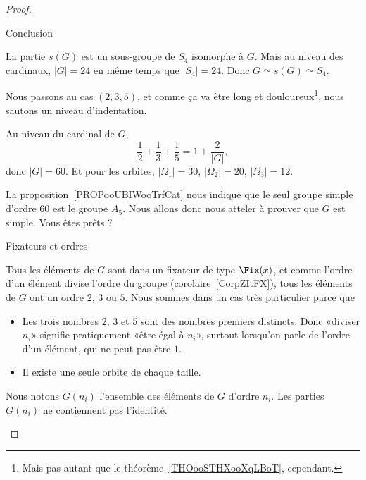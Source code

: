 \begin{proof}
\begin{subproof}
\begin{subproof}
                    \item[Conclusion]

                        La partie \( s(G)\) est un sous-groupe de \( S_4\) isomorphe à \( G\). Mais au niveau des cardinaux, \( | G |=24\) en même temps que \( | S_4 |=24\). Donc \( G\simeq s(G)\simeq S_4\).

                \end{subproof}
                \end{subproof}

        Nous passons au cas \( (2,3,5)\), et comme ça va être long et douloureux\footnote{Mais pas autant que le théorème~\ref{THOooSTHXooXqLBoT}, cependant.}, nous sautons un niveau d'indentation.

                Au niveau du cardinal de \( G\),
                \begin{equation}
                    \frac{1}{ 2 }+\frac{1}{ 3 }+\frac{1}{ 5 }=1+\frac{ 2 }{ | G | },
                \end{equation}
                donc \( | G |=60\). Et pour les orbites, \( | \Omega_1 |=30\), \( | \Omega_2 |=20\), \( | \Omega_3 |=12\).

                La proposition~\ref{PROPooUBIWooTrfCat} nous indique que le seul groupe simple d'ordre \( 60\) est le groupe \( A_5\). Nous allons donc nous atteler à prouver que \( G\) est simple. Vous êtes prêts ?


                \begin{subproof}
                    \item[Fixateurs et ordres]

                Tous les éléments de \( G\) sont dans un fixateur de type \( \Fix(x)\), et comme l'ordre d'un élément divise l'ordre du groupe (corolaire~\ref{CorpZItFX}), tous les éléments de \( G\) ont un ordre \( 2\), \( 3\) ou \( 5\). Nous sommes dans un cas très particulier parce que
                \begin{itemize}
                    \item Les trois nombres \( 2\), \( 3\) et \( 5\) sont des nombres premiers distincts. Donc «diviser \( n_i\)» signifie pratiquement «être égal à \( n_i\)», surtout lorsqu'on parle de l'ordre d'un élément, qui ne peut pas être \( 1\).
                    \item Il existe une seule orbite de chaque taille.
                \end{itemize}
            Nous notons \( G(n_i)\) l'ensemble des éléments de \( G\) d'ordre \( n_i\). Les parties \( G(n_i)\) ne contiennent pas l'identité.


\end{subproof}
\end{proof}
